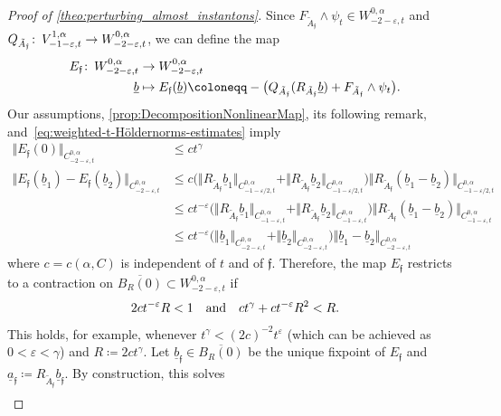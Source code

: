\documentclass[11pt,a4paper]{scrartcl}
\newcommand{\col}{\colon \thinspace}
\newcommand{\VertWHt}[3]{\Vert_{C^{{#1},\alpha}_{{#2},t}{#3}}}
\numberwithin{equation}{section}
\theoremstyle{plain}
\theoremstyle{definition}
\theoremstyle{remark}
\begin{document}
\begin{proof}[Proof of \autoref{theo:perturbing_almost_instantons}]
Since $F_{\tilde{A}_{\mathfrak{f}}}\wedge\psi_t \in W^{0,\alpha}_{-2-\varepsilon,t}$ and $Q_{\tilde{A}_{\mathfrak{f}}}\col V^{1,\alpha}_{-1-\varepsilon,t} \to  W^{0,\alpha}_{-2-\varepsilon,t}$, we can define the map 
\begin{align*}
E_{\mathfrak{f}} \col W^{0,\alpha}_{-2-\varepsilon,t} &\to W^{0,\alpha}_{-2-\varepsilon,t} \\
\underline{b} & \mapsto E_{\mathfrak{f}}(\underline{b}) \coloneqq - \big(Q_{\tilde{A}_{\mathfrak{f}}}(R_{\tilde{A}_{\mathfrak{f}}}\underline{b})+F_{\tilde{A}_{\mathfrak{f}}}\wedge\psi_t \big).
\end{align*}
Our assumptions, \autoref{prop:DecompositionNonlinearMap}, its following remark, and~\eqref{eq:weighted-t-Höldernorms-estimates} imply 
\begin{align*}
\Vert E_{\mathfrak{f}}(0) \VertWHt{0}{-2-\varepsilon}{} &\leq c t^{\gamma} \\
\Vert E_{\mathfrak{f}}(\underline{b}_1)-E_{\mathfrak{f}}(\underline{b}_2) \VertWHt{0}{-2-\varepsilon}{} &\leq  c \big( \Vert R_{\tilde{A}_{\mathfrak{f}}}\underline{b}_1 \VertWHt{0}{-1-\varepsilon/2}{} + \Vert R_{\tilde{A}_{\mathfrak{f}}}\underline{b}_2 \VertWHt{0}{-1-\varepsilon/2}{}\big) \Vert R_{\tilde{A}_{\mathfrak{f}}}(\underline{b}_1 - \underline{b}_2) \VertWHt{0}{-1-\varepsilon/2}{} \\
& \leq c t^{-\varepsilon} \big( \Vert R_{\tilde{A}_{\mathfrak{f}}}\underline{b}_1 \VertWHt{0}{-1-\varepsilon}{} + \Vert R_{\tilde{A}_{\mathfrak{f}}}\underline{b}_2 \VertWHt{0}{-1-\varepsilon}{}\big) \Vert R_{\tilde{A}_{\mathfrak{f}}}(\underline{b}_1 - \underline{b}_2) \VertWHt{0}{-1-\varepsilon}{}\\
& \leq ct^{-\varepsilon} \big( \Vert \underline{b}_1 \VertWHt{0}{-2-\varepsilon}{} + \Vert \underline{b}_2 \VertWHt{0}{-2-\varepsilon}{}\big) \Vert \underline{b}_1 - \underline{b}_2 \VertWHt{0}{-2-\varepsilon}{}
\end{align*}
where $c=c(\alpha,C)$ is independent of $t$ and of $\mathfrak{f}$.
Therefore, the map $E_{\mathfrak{f}}$ restricts to a contraction on $\overline{B_R(0)}\subset W^{0,\alpha}_{-2-\varepsilon,t}$ if \[ 2 ct^{-\varepsilon} R < 1 \quad \textup{and} \quad ct^\gamma + c t^{-\varepsilon} R^2<R.\] This holds, for example, whenever $t^\gamma<(2 c)^{-2}t^{\varepsilon}$ (which can be achieved as $0<\varepsilon< \gamma$) and $R\coloneqq 2 ct^\gamma$. Let $\underline{b}_{\mathfrak{f}} \in \overline{B_R(0)}$ be the unique fixpoint of $E_{\mathfrak{f}}$ and $\underline{a}_{\mathfrak{f}}\coloneqq R_{\tilde{A}_{\mathfrak{f}}}\underline{b}_{\mathfrak{f}}$. By construction, this solves \begin{align*}

\end{align*}
\end{proof}
\end{document}
